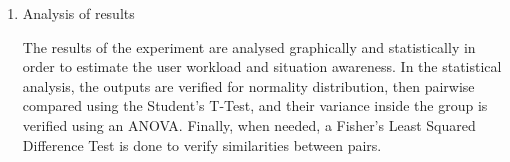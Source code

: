 \begin{enumerate}[label = Step \arabic* -- ]
    \item Analysis of results
    
    The results of the experiment are analysed graphically and statistically in order to estimate the user workload and situation awareness. In the statistical analysis, the outputs are verified for normality distribution, then pairwise compared using the Student’s T-Test, and their variance inside the group is verified using an ANOVA. Finally, when needed, a Fisher’s Least Squared Difference Test is done to verify similarities between pairs.

\end{enumerate}


\FloatBarrier

